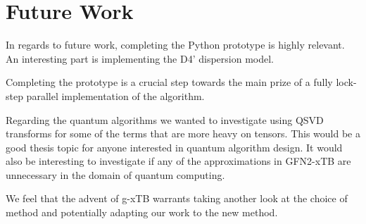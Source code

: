 \chapter{Future Work}
In regards to future work, completing the Python prototype is highly relevant. 
An interesting part is implementing the D4' dispersion model. 

Completing the prototype is a crucial step towards the main prize of a fully lock-step parallel implementation of the algorithm. 

Regarding the quantum algorithms we wanted to investigate using QSVD transforms for some of the terms that are more heavy on tensors. This would be a good thesis topic for anyone interested in quantum algorithm design. It would also be interesting to investigate if any of the approximations in GFN2-xTB are unnecessary in the domain of quantum computing.

We feel that the advent of g-xTB warrants taking another look at the choice of method and potentially adapting our work to the new method. 
